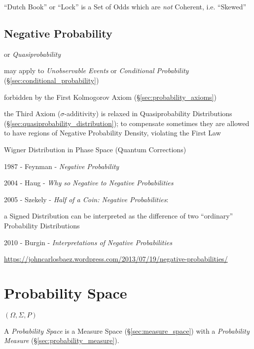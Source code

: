 ``Dutch Book'' or ``Lock'' is a Set of Odds which are \emph{not} Coherent, i.e.
``Skewed''



\subsection{Negative Probability}\label{sec:negative_probability}

or \emph{Quasiprobability}

may apply to \emph{Unobservable Events} or \emph{Conditional Probability}
(\S\ref{sec:conditional_probability})

forbidden by the First Kolmogorov Axiom (\S\ref{sec:probability_axioms})

the Third Axiom ($\sigma$-additivity) is relaxed in Quasiprobability
Distributions (\S\ref{sec:quasiprobability_distribution}); to compensate
sometimes they are allowed to have regions of Negative Probability Density,
violating the First Law

Wigner Distribution in Phase Space (Quantum Corrections)

1987 - Feynman - \emph{Negative Probability}

2004 - Haug - \emph{Why so Negative to Negative Probabilities}

2005 - Szekely - \emph{Half of a Coin: Negative Probabilities}:

a Signed Distribution can be interpreted as the difference of two ``ordinary''
Probability Distributions

2010 - Burgin - \emph{Interpretations of Negative Probabilities}

\url{https://johncarlosbaez.wordpress.com/2013/07/19/negative-probabilities/}



\section{Probability Space}\label{sec:probability_space}

$(\Omega, \Sigma, P)$

A \emph{Probability Space} is a Measure Space (\S\ref{sec:measure_space}) with a
\emph{Probability Measure} (\S\ref{sec:probability_measure}).

